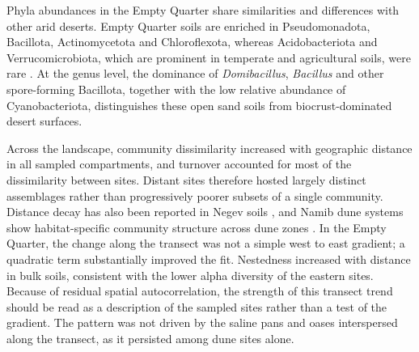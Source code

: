 \documentclass[fleqn,10pt,numbers]{olplainarticle}
\begin{document}
Phyla abundances in the Empty Quarter share similarities and differences with other arid deserts. Empty Quarter soils are enriched in Pseudomonadota, Bacillota, Actinomycetota and Chloroflexota, whereas Acidobacteriota and Verrucomicrobiota, which are prominent in temperate and agricultural soils, were rare \cite{makhalanyane2015microbial,fierer2017embracing,delgadobaquerizo2018global}. At the genus level, the dominance of \textit{Domibacillus}, \textit{Bacillus} and other spore-forming Bacillota, together with the low relative abundance of Cyanobacteriota, distinguishes these open sand soils from biocrust-dominated desert surfaces.

Across the landscape, community dissimilarity increased with geographic distance in all sampled compartments, and turnover accounted for most of the dissimilarity between sites. Distant sites therefore hosted largely distinct assemblages rather than progressively poorer subsets of a single community. Distance decay has also been reported in Negev soils \cite{bay2020negev}, and Namib dune systems show habitat-specific community structure across dune zones \cite{ronca2015namib}. In the Empty Quarter, the change along the transect was not a simple west to east gradient; a quadratic term substantially improved the fit. Nestedness increased with distance in bulk soils, consistent with the lower alpha diversity of the eastern sites. Because of residual spatial autocorrelation, the strength of this transect trend should be read as a description of the sampled sites rather than a test of the gradient. The pattern was not driven by the saline pans and oases interspersed along the transect, as it persisted among dune sites alone.

\end{document}
